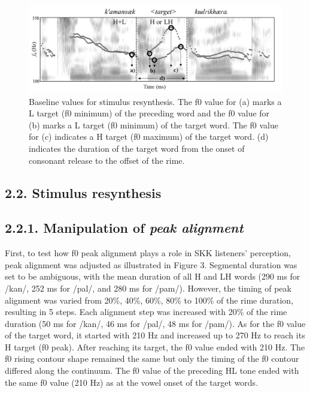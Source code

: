 \documentclass[
  man,floatsintext]{apa6}
\begin{document}
\begin{figure}[H]

{\centering \includegraphics[width=0.9\linewidth]{images/picture2} 

}

\caption{Baseline values for stimulus resynthesis. The f0 value for (a) marks a L target (f0 minimum) of the preceding word and the  f0 value for (b) marks a L target (f0 minimum) of the target word. The f0 value for (c) indicates a H target (f0 maximum) of the target word. (d) indicates the duration of the target word from the onset of consonant release to the offset of the rime.}\label{fig:picture2}
\end{figure}
\newpage

\hypertarget{stimulus-resynthesis}{%
\subsection{2.2. Stimulus resynthesis}\label{stimulus-resynthesis}}

\hypertarget{manipulation-of-peak-alignment}{%
\subsection{\texorpdfstring{2.2.1. Manipulation of \emph{peak alignment}}{2.2.1. Manipulation of peak alignment}}\label{manipulation-of-peak-alignment}}

First, to test how f0 peak alignment plays a role in SKK listeners' perception, peak alignment was adjusted as illustrated in Figure 3. Segmental duration was set to be ambiguous, with the mean duration of all H and LH words (290 ms for /kan/, 252 ms for /pal/, and 280 ms for /pam/). However, the timing of peak alignment was varied from 20\%, 40\%, 60\%, 80\% to 100\% of the rime duration, resulting in 5 steps. Each alignment step was increased with 20\% of the rime duration (50 ms for /kan/, 46 ms for /pal/, 48 ms for /pam/). As for the f0 value of the target word, it started with 210 Hz and increased up to 270 Hz to reach its H target (f0 peak). After reaching its target, the f0 value ended with 210 Hz. The f0 rising contour shape remained the same but only the timing of the f0 contour differed along the continuum. The f0 value of the preceding HL tone ended with the same f0 value (210 Hz) as at the vowel onset of the target words.
\end{document}
